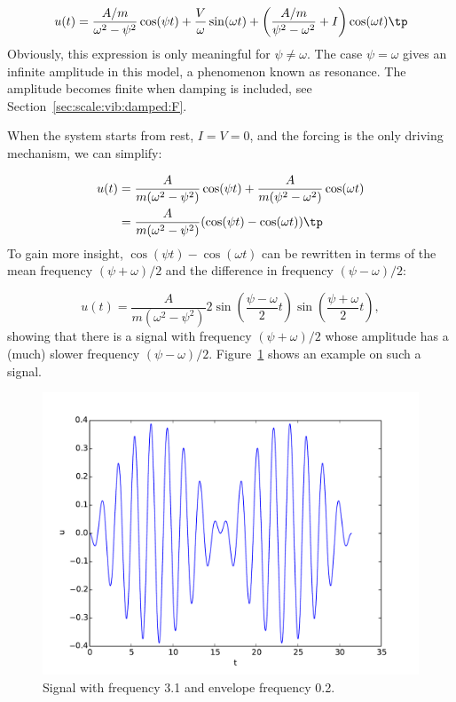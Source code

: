 \documentclass[graybox,envcountchap,sectrefs,final]{svmonodo}
\begin{document}

\[ u(t) = \frac{A/m}{\omega^2 - \psi^2}\cos(\psi t) + \frac{V}{\omega}
   \sin(\omega t) +
\left(\frac{A/m}{\psi^2 - \omega^2} + I\right) \cos (\omega t)\tp
\]
Obviously, this expression is only meaningful for $\psi\neq\omega$. The
case $\psi = \omega$ gives an infinite amplitude in this model, a
phenomenon known as resonance. The amplitude becomes finite when
damping is included,
see Section~\ref{sec:scale:vib:damped:F}.

When the system starts from rest, $I=V=0$, and the
forcing is the only driving mechanism, we can simplify:

\begin{align*}
u(t) &= \frac{A}{m(\omega^2 - \psi^2)}\cos(\psi t)
+
\frac{A}{m(\psi^2 - \omega^2)}\cos (\omega t)\\ 
&= \frac{A}{m(\omega^2 - \psi^2)}(\cos(\psi t) - \cos(\omega t))\tp
\end{align*}
To gain more insight, $\cos(\psi t) - \cos(\omega t)$ can be
rewritten in terms of the mean frequency $(\psi + \omega)/2$ and
the difference in frequency $(\psi - \omega)/2$:

\begin{equation}
u(t) = \frac{A}{m(\omega^2 - \psi^2)} 2
\sin\left(\frac{\psi - \omega}{2}t\right)
\sin\left(\frac{\psi + \omega}{2}t\right),
\label{sec:scale:vib:undamped:F:model:sinsin}
\end{equation}
showing that there is a signal with frequency $(\psi + \omega)/2$
whose amplitude has a (much) slower frequency
$(\psi - \omega)/2$. Figure~\ref{sec:scale:vib:fig:envelope} shows
an example on such a signal.



\begin{figure}[!ht]  %
  \centerline{\includegraphics[width=0.8\linewidth]{fig-scaling/envelope.pdf}}
  \caption{
  Signal with frequency 3.1 and envelope frequency 0.2. \label{sec:scale:vib:fig:envelope}
  }
\end{figure}
\end{document}

